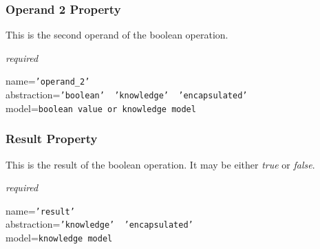 \subsubsection{Operand 2 Property}

This is the second operand of the boolean operation.

\emph{required}

name=\texttt{'operand\_2'}\\
abstraction=\texttt{'boolean' \vline\ 'knowledge' \vline\ 'encapsulated'}\\
model=\texttt{boolean value or knowledge model}

\subsubsection{Result Property}

This is the result of the boolean operation. It may be either \emph{true} or
\emph{false}.

\emph{required}

name=\texttt{'result'}\\
abstraction=\texttt{'knowledge' \vline\ 'encapsulated'}\\
model=\texttt{knowledge model}

